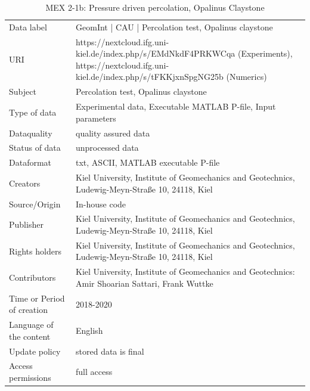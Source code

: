 \begin{table}[!ht]
\caption{MEX 2-1b: Pressure driven percolation, Opalinus Claystone}
\label{tab:dms-mex2-1b}
\small
\begin{tabular}{R{3cm}|L{7cm}}
\hline
%
Data label & GeomInt | CAU | Percolation test, Opalinus claystone\\
URI &  https://nextcloud.ifg.uni-kiel.de/index.php/s/EMdNkdF4PRKWCqa (Experiments), https://nextcloud.ifg.uni-kiel.de/index.php/s/tFKKjxnSpgNG25b (Numerics)
\\
Subject  &  Percolation test, Opalinus claystone\\
Type of data  & Experimental data, Executable MATLAB P-file, Input parameters\\
Dataquality  &  quality assured data \\
Status of data  &  unprocessed data\\
Dataformat  & txt, ASCII, MATLAB executable P-file\\
Creators  &  Kiel University, Institute of Geomechanics and Geotechnics, Ludewig-Meyn-Stra\ss e 10, 24118, Kiel\\
Source/Origin & In-house code \\
Publisher  &  Kiel University, Institute of Geomechanics and Geotechnics, Ludewig-Meyn-Stra\ss e 10, 24118, Kiel \\
Rights holders &  Kiel University, Institute of Geomechanics and Geotechnics, Ludewig-Meyn-Stra\ss e 10, 24118, Kiel \\
Contributors &   Kiel University, Institute of Geomechanics and Geotechnics: Amir Shoarian Sattari, Frank Wuttke\\
Time or Period of creation &  2018-2020\\
Language of the content &  English\\
Update policy &  stored data is final\\
Access permissions & full access\\
%
\hline
\end{tabular}
\end{table}